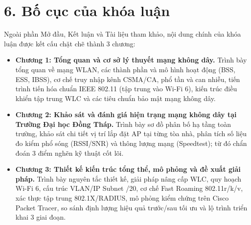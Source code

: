 \section*{6. Bố cục của khóa luận}

Ngoài phần Mở đầu, Kết luận và Tài liệu tham khảo, nội dung chính của khóa luận được kết cấu chặt chẽ thành 3 chương:
\begin{itemize}
    \item \textbf{Chương 1: Tổng quan và cơ sở lý thuyết mạng không dây.} Trình bày tổng quan về mạng WLAN, các thành phần và mô hình hoạt động (BSS, ESS, IBSS), cơ chế truy nhập kênh CSMA/CA, phổ tần và can nhiễu, tiến trình tiến hóa chuẩn IEEE 802.11 (tập trung vào Wi-Fi 6), kiến trúc điều khiển tập trung WLC và các tiêu chuẩn bảo mật mạng không dây.
    \item \textbf{Chương 2: Khảo sát và đánh giá hiện trạng mạng không dây tại Trường Đại học Đồng Tháp.} Trình bày sơ đồ phân bố hạ tầng toàn trường, khảo sát chi tiết vị trí lắp đặt AP tại từng tòa nhà, phân tích số liệu đo kiểm phổ sóng (RSSI/SNR) và thông lượng mạng (Speedtest); từ đó chẩn đoán 3 điểm nghẽn kỹ thuật cốt lõi.
    \item \textbf{Chương 3: Thiết kế kiến trúc tổng thể, mô phỏng và đề xuất giải pháp.} Trình bày nguyên tắc thiết kế, giải pháp nâng cấp WLC, quy hoạch Wi-Fi 6, cấu trúc VLAN/IP Subnet /20, cơ chế Fast Roaming 802.11r/k/v, xác thực tập trung 802.1X/RADIUS, mô phỏng kiểm chứng trên Cisco Packet Tracer, so sánh định lượng hiệu quả trước/sau tối ưu và lộ trình triển khai 3 giai đoạn.
\end{itemize}
